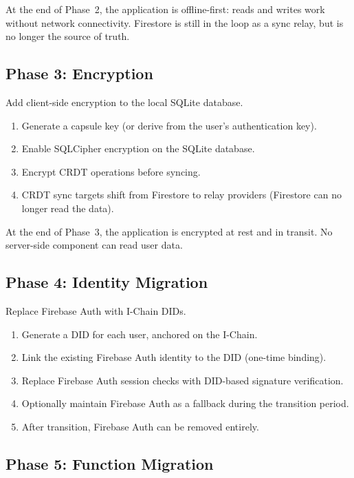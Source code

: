 At the end of Phase~2, the application is offline-first: reads and writes
work without network connectivity. Firestore is still in the loop as a
sync relay, but is no longer the source of truth.

\subsection{Phase 3: Encryption}

Add client-side encryption to the local SQLite database.

\begin{enumerate}
    \item Generate a capsule key (or derive from the user's authentication key).
    \item Enable SQLCipher encryption on the SQLite database.
    \item Encrypt CRDT operations before syncing.
    \item CRDT sync targets shift from Firestore to relay providers (Firestore
    can no longer read the data).
\end{enumerate}

At the end of Phase~3, the application is encrypted at rest and in transit.
No server-side component can read user data.

\subsection{Phase 4: Identity Migration}

Replace Firebase Auth with I-Chain DIDs.

\begin{enumerate}
    \item Generate a DID for each user, anchored on the I-Chain.
    \item Link the existing Firebase Auth identity to the DID (one-time binding).
    \item Replace Firebase Auth session checks with DID-based signature verification.
    \item Optionally maintain Firebase Auth as a fallback during the transition period.
    \item After transition, Firebase Auth can be removed entirely.
\end{enumerate}

\subsection{Phase 5: Function Migration}

